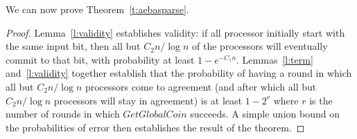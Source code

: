 \documentclass{sig-alternate}
\begin{document}
We can now prove Theorem~\ref{t:aebasparse}.\\
\begin{proof}
Lemma~\ref{l:validity} establishes validity: if all processor initially start with the same input bit, then all but $C_{2}n/ \log n$ of the processors will eventually commit to that bit, with probability at least $1-e^{-C_{1}n}$.  Lemmas~\ref{l:term} and~\ref{l:validity} together establish that the probability of having a round in which all but $C_{2}n/ \log n$ processors come to agreement (and after which all but $C_{2}n/ \log n$ processors  will stay in agreement) is at least $1-2^{r}$ where $r$ is the number of rounds in which $GetGlobalCoin$ succeeds.  A simple union bound on the probabilities of error then establishes the result of the theorem.
\end{proof}
\end{document}
